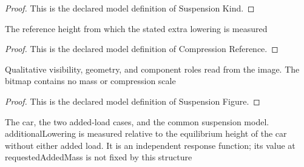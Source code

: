 \begin{proof}
  This is the declared model definition of Suspension Kind.
\end{proof}
\begin{definition}
  \label{def:physics:phyx-mini-0199:phyxminiproblems-problemphyxmini0199-compressionreference}
  The reference height from which the stated extra lowering is measured
\end{definition}
\begin{proof}
  This is the declared model definition of Compression Reference.
\end{proof}
\begin{definition}
  \label{def:physics:phyx-mini-0199:phyxminiproblems-problemphyxmini0199-suspensionfigure}
  Qualitative visibility, geometry, and component roles read from the image. The bitmap contains no mass or compression scale
\end{definition}
\begin{proof}
  This is the declared model definition of Suspension Figure.
\end{proof}
\begin{definition}
  \label{def:physics:phyx-mini-0199:phyxminiproblems-problemphyxmini0199-carsuspensionsetup}
  The car, the two added-load cases, and the common suspension model. additionalLowering is measured relative to the equilibrium height of the car without either added load. It is an independent response function; its value at requestedAddedMass is not fixed by this structure
\end{definition}
